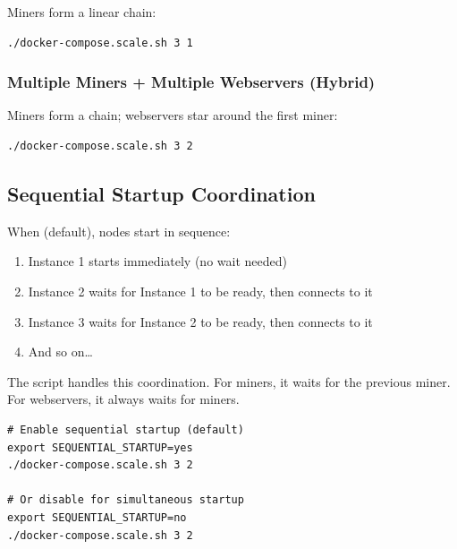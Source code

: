 Miners form a linear chain:

\begin{listing}[htbp]
\caption{Chain Topology: Multiple Miners}
\label{lst:ch22-chain-topology}
\begin{verbatim}
./docker-compose.scale.sh 3 1
\end{verbatim}
\end{listing}

\subsubsection{Multiple Miners + Multiple Webservers (Hybrid)}

Miners form a chain; webservers star around the first miner:

\begin{listing}[htbp]
\caption{Hybrid Topology: Multiple Miners and Webservers}
\label{lst:ch22-hybrid-topology}
\begin{verbatim}
./docker-compose.scale.sh 3 2
\end{verbatim}
\end{listing}

\subsection{Sequential Startup Coordination}

When  (default), nodes start in sequence:

\begin{enumerate}
  \item Instance 1 starts immediately (no wait needed)
  \item Instance 2 waits for Instance 1 to be ready, then connects to it
  \item Instance 3 waits for Instance 2 to be ready, then connects to it
  \item And so on\ldots
\end{enumerate}

The  script handles this coordination. For miners, it waits for the previous miner. For webservers, it always waits for miners.

\begin{listing}[htbp]
\caption{Sequential Startup Configuration}
\label{lst:ch22-sequential-config}
\begin{verbatim}
# Enable sequential startup (default)
export SEQUENTIAL_STARTUP=yes
./docker-compose.scale.sh 3 2

# Or disable for simultaneous startup
export SEQUENTIAL_STARTUP=no
./docker-compose.scale.sh 3 2
\end{verbatim}
\end{listing}

